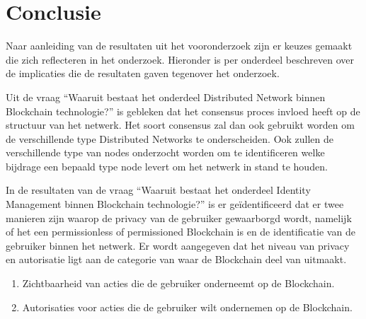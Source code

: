 \section{Conclusie}

Naar aanleiding van de resultaten uit het vooronderzoek zijn er keuzes gemaakt die zich reflecteren in het onderzoek. Hieronder is per onderdeel beschreven over de implicaties die de resultaten gaven tegenover het onderzoek. 

Uit de vraag ``Waaruit bestaat het onderdeel Distributed Network binnen Blockchain technologie?'' is gebleken dat het consensus proces invloed heeft op de structuur van het netwerk. Het soort consensus zal dan ook gebruikt worden om de verschillende type Distributed Networks te onderscheiden. Ook zullen de verschillende type van nodes onderzocht worden om te identificeren welke bijdrage een bepaald type node levert om het netwerk in stand te houden. 

In de resultaten van de vraag ``Waaruit bestaat het onderdeel Identity Management binnen Blockchain technologie?'' is er geïdentificeerd dat er twee manieren zijn waarop de privacy van de gebruiker gewaarborgd wordt, namelijk of het een permissionless of permissioned Blockchain is en de identificatie van de gebruiker binnen het netwerk. Er wordt aangegeven dat het niveau van privacy en autorisatie ligt aan de categorie van waar de Blockchain deel van uitmaakt.

\begin{enumerate}
  \item Zichtbaarheid van acties die de gebruiker onderneemt op de Blockchain.
  \item Autorisaties voor acties die de gebruiker wilt ondernemen op de Blockchain.
\end{enumerate}
